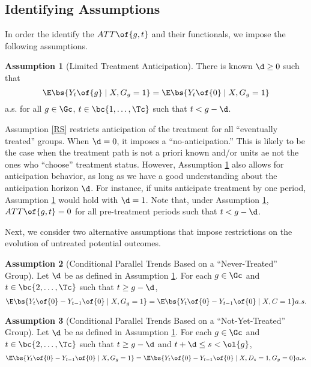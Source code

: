\documentclass[12pt]{article}
\theoremstyle{definition}
\newtheorem{assumption}{Assumption}
\begin{document}
\subsection{Identifying Assumptions}

In order the identify the $ATT\of{g, t}$ and their functionals, we impose the following assumptions.

\begin{assumption}[Limited Treatment Anticipation] \label{LTA}
    There is known $\d \geq 0$ such that 
    $$
    \E\bs{Y_t\of{g} \mid X, G_g = 1} = \E\bs{Y_t\of{0} \mid X, G_g = 1}
    $$
    a.s. for all $g \in \Gc$, $t \in \bc{1, \ldots, \Tc}$ such that $t < g - \d$.
\end{assumption}

Assumption \ref{RS} restricts anticipation of the treatment for all ``eventually treated'' groups. When $\d = 0$, it imposes a ``no-anticipation.'' This is likely to be the case when the treatment path is not a priori known and/or units ae not the ones who ``choose'' treatment status. However, Assumption \ref{LTA} also allows for anticipation behavior, as long as we have a good understanding about the anticipation horizon $\d$. For instance, if units anticipate treatment by one period, Assumption \ref{LTA} would hold with $\d = 1$. Note that, under Assumption \ref{LTA}, $ATT\of{g, t} = 0$ for all pre-treatment periods such that $t < g - \d$.

Next, we consider two alternative assumptions that impose restrictions on the evolution of untreated potential outcomes.

\begin{assumption}[Conditional Parallel Trends Based on a ``Never-Treated'' Group] \label{CPT1}
    Let $\d$ be as defined in Assumption \ref{LTA}. For each $g \in \Gc$ and $t \in \bc{2, \ldots, \Tc}$ such that $t \geq g - \d$,
    $$
    \E\bs{Y_t\of{0} - Y_{t-1}\of{0} \mid X, G_g = 1} = \E\bs{Y_t\of{0} - Y_{t-1}\of{0} \mid X, C = 1} a.s.
    $$
\end{assumption}

\begin{assumption}[Conditional Parallel Trends Based on a ``Not-Yet-Treated'' Group] \label{CPT2}
    Let $\d$ be as defined in Assumption \ref{LTA}. For each $g \in \Gc$ and $t \in \bc{2, \ldots, \Tc}$ such that $t \geq g - \d$ and $t + \d \leq s < \ol{g}$,
    $$
    \E\bs{Y_t\of{0} - Y_{t-1}\of{0} \mid X, G_g = 1} = \E\bs{Y_t\of{0} - Y_{t-1}\of{0} \mid X, D_s = 1, G_g = 0} a.s.
    $$
\end{assumption}
\end{document}
